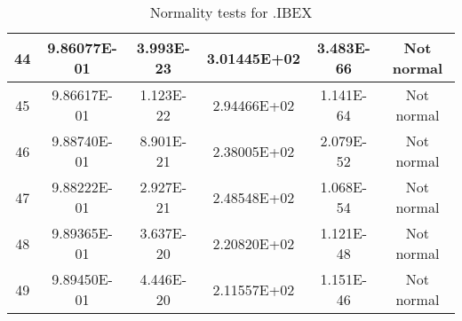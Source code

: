 \begin{table}[h]
\begin{tabular}{|c|c|c|c|c|c|}
		44 & 9.86077E-01 & 3.993E-23 & 3.01445E+02 & 3.483E-66 & Not normal\\\hline
		45 & 9.86617E-01 & 1.123E-22 & 2.94466E+02 & 1.141E-64 & Not normal\\\hline
		46 & 9.88740E-01 & 8.901E-21 & 2.38005E+02 & 2.079E-52 & Not normal\\\hline
		47 & 9.88222E-01 & 2.927E-21 & 2.48548E+02 & 1.068E-54 & Not normal\\\hline
		48 & 9.89365E-01 & 3.637E-20 & 2.20820E+02 & 1.121E-48 & Not normal\\\hline
		49 & 9.89450E-01 & 4.446E-20 & 2.11557E+02 & 1.151E-46 & Not normal\\\hline
	\end{tabular}
	\caption{Normality tests for .IBEX}
	\label{tab:normality_tests_IBEX}
\end{table}
